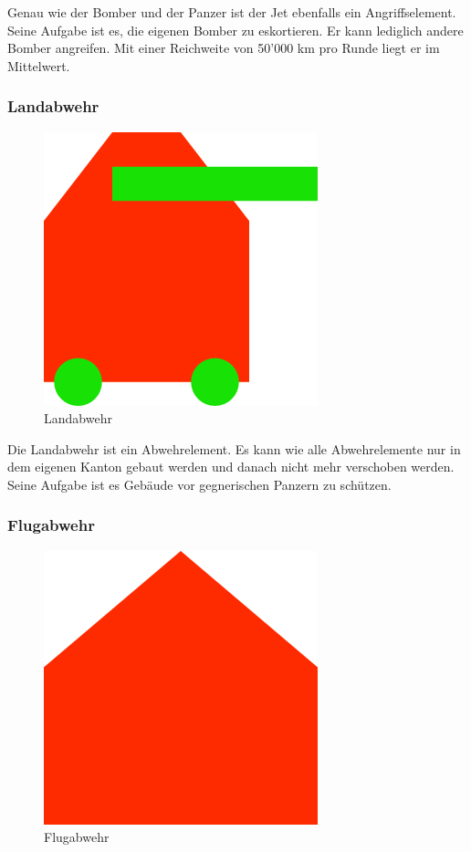 \documentclass[ngerman, 12pt, pdftex]{scrartcl}[2006/07/30]
\begin{document}
Genau wie der Bomber und der Panzer ist der Jet ebenfalls ein Angriffselement.
Seine Aufgabe ist es, die eigenen Bomber zu eskortieren. Er kann lediglich andere Bomber angreifen. Mit einer Reichweite von 50'000 km pro Runde liegt er im Mittelwert.

\newpage

\subsubsection{Landabwehr}


\begin{figure}[h]
\centering
\includegraphics[scale=1.8]{einheiten/Landabwehr.png}
\caption{Landabwehr}
\end{figure}

Die Landabwehr ist ein Abwehrelement. Es kann wie alle Abwehrelemente nur in dem eigenen Kanton gebaut werden und danach nicht mehr verschoben werden. Seine Aufgabe ist es Gebäude vor gegnerischen Panzern zu schützen.


\subsubsection{Flugabwehr}

\begin{figure}[h]
\centering
\includegraphics[scale=18]{einheiten/Flugabwehr.png}
\caption{Flugabwehr}
\end{figure}
\end{document}
